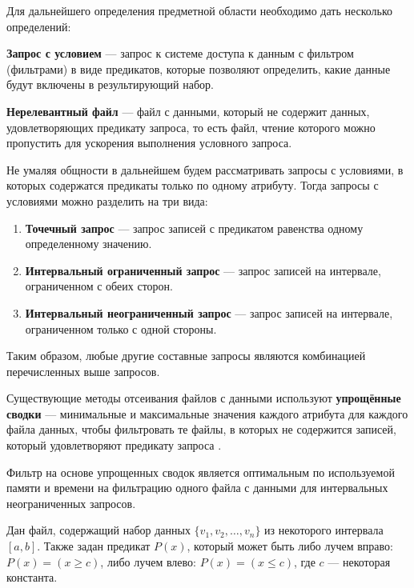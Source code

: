 Для дальнейшего определения предметной области необходимо дать несколько определений:
\begin{definition}
    \textbf{Запрос с условием} --- запрос к системе доступа к данным с фильтром (фильтрами) в виде предикатов, которые позволяют определить, какие данные будут включены в результирующий набор.
\end{definition}
\begin{definition}
    \textbf{Нерелевантный файл} --- файл с данными, который не содержит данных, удовлетворяющих предикату запроса, то есть файл, чтение которого можно пропустить для ускорения выполнения условного запроса.
\end{definition}

Не умаляя общности в дальнейшем будем рассматривать запросы с условиями, в которых содержатся предикаты только по одному атрибуту. Тогда запросы с условиями можно разделить на три вида:
\begin{enumerate}
    \item \textbf{Точечный запрос} ---  запрос записей с предикатом равенства одному определенному значению.
    \item \textbf{Интервальный ограниченный запрос} --- запрос записей на интервале, ограниченном с обеих сторон.
    \item \textbf{Интервальный неограниченный запрос} --- запрос записей на интервале, ограниченном только с одной стороны.
\end{enumerate}
Таким образом, любые другие составные запросы являются комбинацией перечисленных выше запросов.

Существующие методы отсеивания файлов с данными используют \textbf{упрощённые сводки} --- минимальные и максимальные значения каждого атрибута для каждого файла данных, чтобы фильтровать те файлы, в которых не содержится записей, который удовлетворяют предикату запроса \cite{Extensible_data_skipping, Small_Materialized_Aggregates}.
\begin{theorem} \label{theorema}
    Фильтр на основе упрощенных сводок является оптимальным по используемой памяти и времени на фильтрацию одного файла с данными для интервальных неограниченных запросов.
\end{theorem}
\proof

Дан файл, содержащий набор данных $\{v_1, v_2, \ldots, v_n\}$ из некоторого интервала $[a, b]$. Также задан предикат $P(x)$, который может быть либо лучем вправо: $P(x) = (x \geq c)$, либо лучем влево: $P(x) = (x \leq c)$, где $c$ — некоторая константа.

